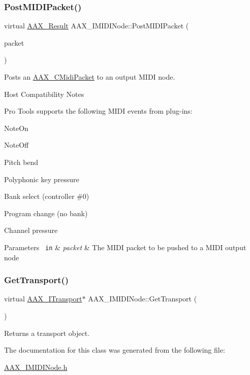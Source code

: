 \subsubsection{\texorpdfstring{PostMIDIPacket()}{PostMIDIPacket()}}
{\footnotesize\ttfamily virtual \mbox{\hyperlink{a00392_a4d8f69a697df7f70c3a8e9b8ee130d2f}{A\+A\+X\+\_\+\+Result}} A\+A\+X\+\_\+\+I\+M\+I\+D\+I\+Node\+::\+Post\+M\+I\+D\+I\+Packet (\begin{DoxyParamCaption}\item[{\mbox{\hyperlink{a01429}{A\+A\+X\+\_\+\+C\+Midi\+Packet}} $\ast$}]{packet }\end{DoxyParamCaption})\hspace{0.3cm}{\ttfamily [pure virtual]}}



Posts an \mbox{\hyperlink{a01429}{A\+A\+X\+\_\+\+C\+Midi\+Packet}} to an output M\+I\+DI node. 

\begin{DoxyRefDesc}{Host Compatibility Notes}
\item[\mbox{\hyperlink{a00786__compatibility_notes000059}{Host Compatibility Notes}}]Pro Tools supports the following M\+I\+DI events from plug-\/ins\+:
\begin{DoxyItemize}
\item Note\+On
\item Note\+Off
\item Pitch bend
\item Polyphonic key pressure
\item Bank select (controller \#0)
\item Program change (no bank)
\item Channel pressure
\end{DoxyItemize}\end{DoxyRefDesc}



\begin{DoxyParams}[1]{Parameters}
\mbox{\texttt{ in}}  & {\em packet} & The M\+I\+DI packet to be pushed to a M\+I\+DI output node \\
\hline
\end{DoxyParams}
\mbox{\label{a01845_a57bd132ee74047e25298b157c0bff2f9}} 
\subsubsection{\texorpdfstring{GetTransport()}{GetTransport()}}
{\footnotesize\ttfamily virtual \mbox{\hyperlink{a01885}{A\+A\+X\+\_\+\+I\+Transport}}$\ast$ A\+A\+X\+\_\+\+I\+M\+I\+D\+I\+Node\+::\+Get\+Transport (\begin{DoxyParamCaption}{ }\end{DoxyParamCaption})\hspace{0.3cm}{\ttfamily [pure virtual]}}



Returns a transport object. 



The documentation for this class was generated from the following file\+:\begin{DoxyCompactItemize}
\item 
\mbox{\hyperlink{a00614}{A\+A\+X\+\_\+\+I\+M\+I\+D\+I\+Node.\+h}}\end{DoxyCompactItemize}

